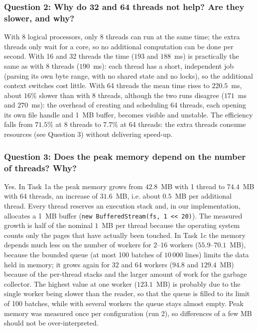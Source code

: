 \documentclass[11pt,a4paper]{article}
\begin{document}
\subsubsection{Question 2: Why do 32 and 64 threads not help? Are they slower, and why?}
With 8 logical processors, only 8 threads can run at the same time; the extra threads only wait for a core, so no additional computation can be done per second. With 16 and 32 threads the time ($193$ and $188$~ms) is practically the same as with 8 threads ($190$~ms): each thread has a short, independent job (parsing its own byte range, with no shared state and no locks), so the additional context switches cost little. With 64 threads the mean time rises to $220.5$~ms, about $16\%$ slower than with 8 threads, although the two runs disagree ($171$~ms and $270$~ms): the overhead of creating and scheduling 64 threads, each opening its own file handle and 1~MB buffer, becomes visible and unstable. The efficiency falls from $71.5\%$ at 8 threads to $7.7\%$ at 64 threads: the extra threads consume resources (see Question 3) without delivering speed-up.

\subsubsection{Question 3: Does the peak memory depend on the number of threads? Why?}
Yes. In Task 1a the peak memory grows from $42.8$~MB with 1 thread to $74.4$~MB with 64 threads, an increase of $31.6$~MB, i.e. about $0.5$~MB per additional thread. Every thread reserves an execution stack and, in our implementation, allocates a 1~MB buffer (\texttt{new BufferedStream(fs, 1 << 20)}). The measured growth is half of the nominal $1$~MB per thread because the operating system counts only the pages that have actually been touched. In Task 1c the memory depends much less on the number of workers for $2$--$16$ workers ($55.9$--$70.1$~MB), because the bounded queue (at most 100 batches of $10\,000$ lines) limits the data held in memory; it grows again for 32 and 64 workers ($94.8$ and $129.4$~MB) because of the per-thread stacks and the larger amount of work for the garbage collector. The highest value at one worker ($123.1$~MB) is probably due to the single worker being slower than the reader, so that the queue is filled to its limit of 100 batches, while with several workers the queue stays almost empty. Peak memory was measured once per configuration (run 2), so differences of a few MB should not be over-interpreted.
\end{document}
